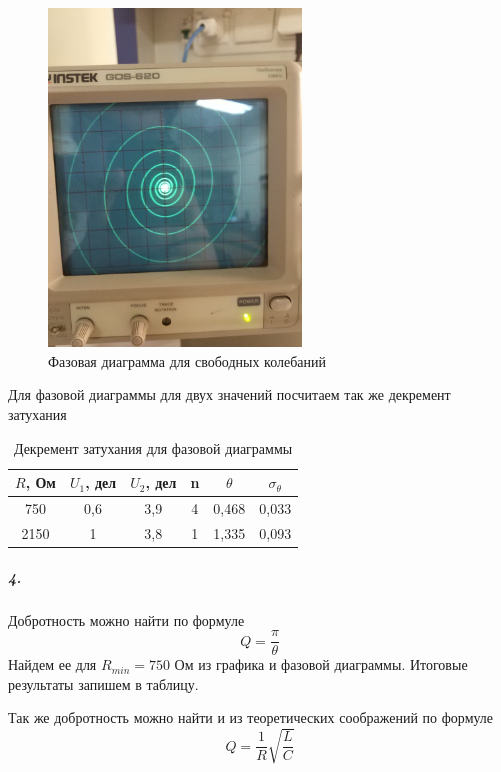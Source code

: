 \documentclass[a4paper,12pt]{article}
\begin{document}
\begin{figure}[h!]
\begin{center}
\includegraphics[width = 0.6\textwidth]{1.jpg}
\caption{Фазовая диаграмма для свободных колебаний}
\end{center}
\end{figure}
Для фазовой диаграммы для двух значений посчитаем так же декремент затухания

\begin{table}[h!]
\begin{center}
\begin{tabular}{|c|c|c|c|c|c|}
\hline
$R$, Ом &$U_1$, дел & $U_2$, дел & n & $\theta$ & $\sigma_{\theta}$ \\ \hline
750 & 0,6        & 3,9        & 4  & 0,468  & 0,033              \\ \hline
2150& 1          & 3,8        & 1  & 1,335     & 0,093              \\ \hline
\end{tabular}
\caption{Декремент затухания для фазовой диаграммы}
\end{center}
\end{table}
\subparagraph{4.}Добротность можно найти по формуле 
\[Q = \dfrac{\pi}{\theta}\]
Найдем ее для $R_{min} = 750$ Ом из графика и фазовой диаграммы. Итоговые результаты запишем в таблицу.

Так же добротность можно найти и из теоретических соображений по формуле
\[Q = \dfrac{1}{R}\sqrt{\dfrac{L}{C}}\]
\end{document}
